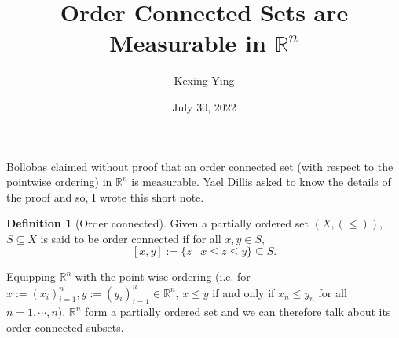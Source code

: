 \documentclass[]{article}
\theoremstyle{definition}
\theoremstyle{definition}
\newtheorem*{definition*}{Definition}
\begin{document}
\title{Order Connected Sets are Measurable in \(\mathbb{R}^n\)}
\author{Kexing Ying}
\date{July 30, 2022}
\maketitle

Bollobas claimed without proof that an order connected set (with respect to the pointwise ordering) 
in \(\mathbb{R}^n\) is measurable. Yael Dillis asked to know the details of the proof and so, I wrote 
this short note.

\begin{definition*}[Order connected]
  Given a partially ordered set \((X, (\le))\), \(S \subseteq X\) is said to be order connected if for all \(x, y \in S\), 
  \[[x, y] := \{z \mid x \le z \le y\} \subseteq S.\]
\end{definition*}

Equipping \(\mathbb{R}^n\) with the point-wise ordering (i.e. for 
\(x := (x_i)_{i = 1}^n,  y := (y_i)_{i = 1}^n \in \mathbb{R}^n\), \(x \le y\) if and only if 
\(x_n \le y_n\) for all \(n = 1, \cdots, n\)), \(\mathbb{R}^n\) form a partially ordered set and we 
can therefore talk about its order connected subsets.
\end{document}
